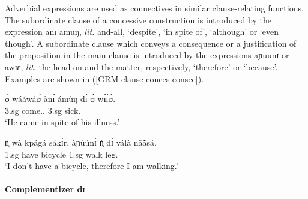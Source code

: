 \z 
 \z
 

Adverbial expressions are used as connectives in similar clause-relating
functions. The subordinate clause of a concessive construction is introduced by
the expression  {\sls anɪ amuŋ}, {\it lit.} and-all, `despite',  `in spite
of', `although' or `even though'. A subordinate clause  which conveys a
consequence or a justification of the proposition in the main clause  is
introduced by the expressions {\sls aɲuunɪ} or {\sls awɪɛ}, {\it lit.} 
the-head-on
 and  the-matter,  respectively,  `therefore' or
`because'. Examples are shown in (\ref{GRM-clause-conces-consec}).

\ea\label{GRM-clause-conces-consec}

\ea\label{GRM-clause-conces}

\gll ʊ̀ wááwáʊ́ {ànɪ́ ámùŋ} dɪ́ ʊ̀ wɪ́ɪ́ʊ̀.\\
    {\sc 3.sg} come.{\pfv .\foc} {\conn} {\comp}  {\sc 3.sg} sick.{\foc}\\
\glt  `He came in spite of his illness.' 


\ex\label{GRM-clause-consec-1}

\gll ǹ̩ wà kpágá sákɪ̀r, {àɲúúnɪ̀} ǹ̩ dɪ̀ válà nã̀ã̀sá.\\
{\sc 1.sg} {\neg} have bicycle {\conn} {\sc 1.sg}   {\ipfv} walk
leg.{\pl}\\
\glt `I don't have a bicycle, therefore I am
walking.'


 \z 
 \z
 

\paragraph{Complementizer dɪ}
\label{GRM-clause-comp-di}


